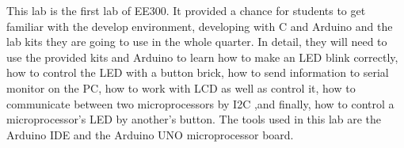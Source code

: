 This lab is the first lab of EE300. It provided a chance for students to get familiar with the develop environment, developing with C and Arduino and the lab kits they are going to use in the whole quarter. In detail, they will need to use the provided kits and Arduino to learn how to make an LED blink correctly, how to control the LED with a button brick, how to send information to serial monitor on the PC, how to work with LCD as well as control it, how to communicate between two microprocessors by I2C ,and finally, how to control a microprocessor's LED by another's button. The tools used in this lab are the Arduino IDE and the Arduino UNO microprocessor board.